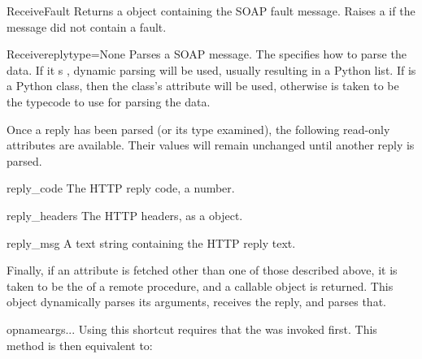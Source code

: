 \begin{methoddesc}{ReceiveFault}{}
Returns a  object containing the SOAP fault message.
Raises a  if the message did not contain a fault.
\end{methoddesc}

\begin{methoddesc}{Receive}{replytype=None}
Parses a SOAP message.
The  specifies how to parse the data.
If it s , dynamic parsing will be used, usually resulting
in a Python list.
If  is a Python class, then the class's 
attribute will be used, otherwise  is taken to be
the typecode to use for parsing the data.
\end{methoddesc}

Once a reply has been parsed (or its type examined), the following
read-only attributes are available.
Their values will remain unchanged until another reply is parsed.

\begin{memberdesc}{reply_code}
The HTTP reply code, a number.
\end{memberdesc}

\begin{memberdesc}{reply_headers}
The HTTP headers, as a  object.
\end{memberdesc}

\begin{memberdesc}{reply_msg}
A text string containing the HTTP reply text.
\end{memberdesc}

Finally, if an attribute is fetched other than one of those described
above, it is taken to be the  of a remote procedure,
and a callable object is returned.
This object dynamically parses its arguments, receives the reply, and
parses that.

\begin{methoddesc}{opname}{args...}
Using this shortcut requires that the  was invoked first.
This method is then equivalent to:
\end{methoddesc}

